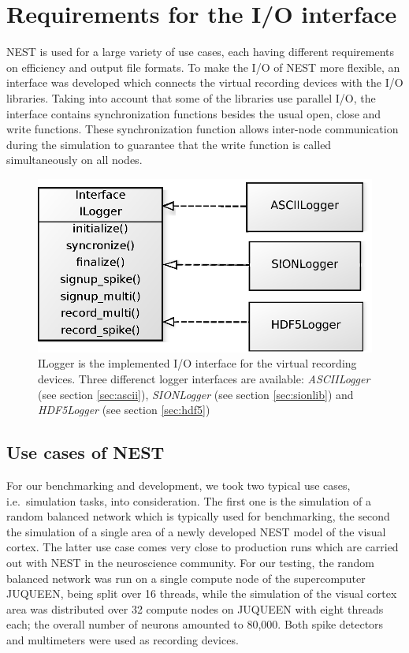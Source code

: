 \documentclass[]{YIC2015}
\begin{document}
\section{Requirements for the I/O interface}

NEST is used for a large variety of use cases, each having different
requirements on efficiency and output file formats. To make the I/O of
NEST more flexible, an interface was developed which connects the
virtual recording devices with the I/O libraries. Taking into account that some
of the libraries use parallel I/O, the interface contains
synchronization functions besides the usual open, close and write
functions. These synchronization function allows inter-node
communication during the simulation to guarantee that the write
function is called simultaneously on all nodes.

\begin{figure}[htbp]
\centering %
\includegraphics[scale=0.5]{loggerinterface.eps}
\caption{ILogger is the implemented I/O interface for the virtual recording devices. 
Three differenct logger interfaces are available: \emph{ASCIILogger} (see section \ref{sec:ascii}),
\emph{SIONLogger} (see section \ref{sec:sionlib}) and \emph{HDF5Logger} (see section \ref{sec:hdf5})}
\label{fig:loggerinterface}
\end{figure}

\subsection{Use cases of NEST}

For our benchmarking and development, we took two typical use cases,
i.e.~simulation tasks, into consideration. The first one is the simulation of a
random balanced network \cite{morrison07} which is typically used for
benchmarking, the second the simulation of a single area of a newly developed
NEST model of the visual cortex. The latter use case comes very close to
production runs which are carried out with NEST in the neuroscience community.
For our testing, the random balanced network was run on a single compute node of
the supercomputer JUQUEEN, being split over 16 threads, while the simulation of
the visual cortex area was distributed over 32 compute nodes on JUQUEEN with
eight threads each; the overall number of neurons amounted to 80,000. Both spike
detectors and multimeters were used as recording devices.
\end{document}
